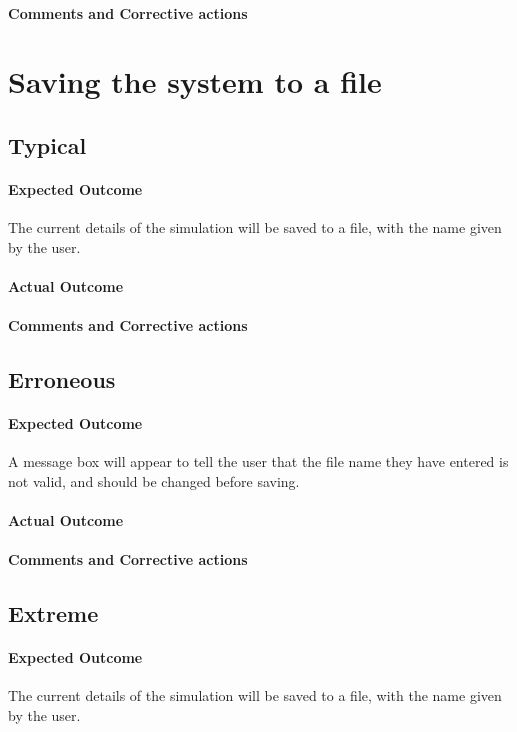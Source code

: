 \paragraph{Comments and Corrective actions}


\section{Saving the system to a file}
\subsection{Typical}
\paragraph{Expected Outcome}
The current details of the simulation will be saved to a file, with the name
given by the user.
\paragraph{Actual Outcome}
\paragraph{Comments and Corrective actions}

\subsection{Erroneous}
\paragraph{Expected Outcome}
A message box will appear to tell the user that the file name they have entered
is not valid, and should be changed before saving.
\paragraph{Actual Outcome}
\paragraph{Comments and Corrective actions}

\subsection{Extreme}
\paragraph{Expected Outcome}
The current details of the simulation will be saved to a file, with the name
given by the user.
